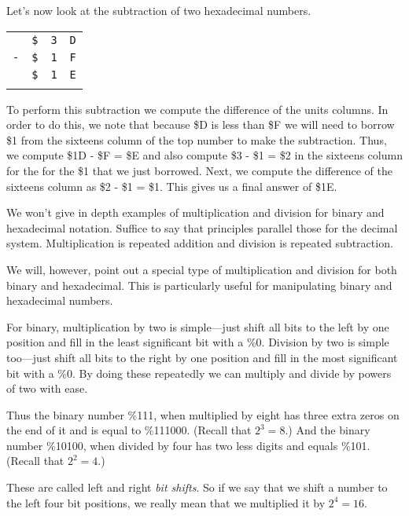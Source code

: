 Let's now look at the subtraction of two hexadecimal numbers.

\begin{center}
	\begin{tabular}{cccc}
								& \texttt{\$} & \texttt{3} & \texttt{D} \\
		\texttt{-}  & \texttt{\$} & \texttt{1} & \texttt{F} \\ \hline
								& \texttt{\$} & \texttt{1} & \texttt{E} \\ \hhline{====}
	\end{tabular}
\end{center}

To perform this subtraction we compute the difference of the units columns. In order to do this, we note that because \$D is less than \$F we will need to borrow \$1 from the sixteens column of the top number to make the subtraction. Thus, we compute \$1D - \$F = \$E and also compute \$3 - \$1 = \$2 in the sixteens column for the for the \$1 that we just borrowed. Next, we compute the difference of the sixteens column as \$2 - \$1 = \$1. This gives us a final answer of \$1E.

We won't give in depth examples of multiplication and division for binary and hexadecimal notation. Suffice to say that principles parallel those for the decimal system. Multiplication is repeated addition and division is repeated subtraction.

We will, however, point out a special type of multiplication and division for both binary and hexadecimal. This is particularly useful for manipulating binary and hexadecimal numbers.

For binary, multiplication by two is simple---just shift all bits to the left by one position and fill in the least significant bit with a \%0. Division by two is simple too---just shift all bits to the right by one position and fill in the most significant bit with a \%0. By doing these repeatedly we can multiply and divide by powers of two with ease.

Thus the binary number \%111, when multiplied by eight has three extra zeros on the end of it and is equal to \%111000. (Recall that $2^{3} = 8$.) And the binary number \%10100, when divided by four has two less digits and equals \%101. (Recall that $2^{2} = 4$.)

These are called left and right {\it bit shifts}. So if we say that we shift a number to the left four bit positions, we really mean that we multiplied it by $2^{4} = 16$.

